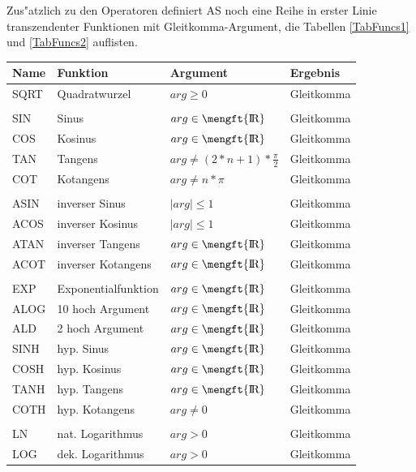 \documentclass[12pt,a4paper,twoside]{report}
\newcommand{\asname}{AS}
\def \rz{\hbox{\mengft{I \hskip -1.7mm R}}}
\begin{document}
Zus"atzlich zu den Operatoren definiert \asname{} noch eine Reihe
in erster Linie transzendenter Funktionen mit Gleitkomma-Argument, die
Tabellen \ref{TabFuncs1} und \ref{TabFuncs2} auflisten.
\begin{center}\begin{longtable}{|l|l|l|l|}
\hline
Name     & Funktion             & Argument & Ergebnis \\
\hline
\hline
SQRT     & Quadratwurzel        & $arg \geq 0$ & Gleitkomma \\
         &                      & & \\
SIN      & Sinus                & $arg \in \rz$ & Gleitkomma \\
COS      & Kosinus              & $arg \in \rz$ & Gleitkomma \\
TAN      & Tangens              & $arg \neq (2*n+1)*\frac{\pi}{2}$ & Gleitkomma \\
COT      & Kotangens            & $arg \neq n*\pi$ & Gleitkomma \\
         &                      & & \\
ASIN     & inverser Sinus       & $\mid arg \mid \leq 1$ & Gleitkomma \\
ACOS     & inverser Kosinus     & $\mid arg \mid \leq 1$ & Gleitkomma \\
ATAN     & inverser Tangens     & $arg \in \rz$ & Gleitkomma \\
ACOT     & inverser Kotangens   & $arg \in \rz$ & Gleitkomma \\
         &                      & & \\
EXP      & Exponentialfunktion  & $arg \in \rz$ & Gleitkomma \\
ALOG     & 10 hoch Argument     & $arg \in \rz$ & Gleitkomma \\
ALD      & 2 hoch Argument      & $arg \in \rz$ & Gleitkomma \\
SINH     & hyp. Sinus           & $arg \in \rz$ & Gleitkomma \\
COSH     & hyp. Kosinus         & $arg \in \rz$ & Gleitkomma \\
TANH     & hyp. Tangens         & $arg \in \rz$ & Gleitkomma \\
COTH     & hyp. Kotangens       & $arg \neq 0$ & Gleitkomma \\
         &                      & & \\
LN       & nat. Logarithmus     & $arg > 0$ & Gleitkomma \\
LOG      & dek. Logarithmus     & $arg > 0$ & Gleitkomma \\

\end{longtable}
\end{center}
\end{document}
